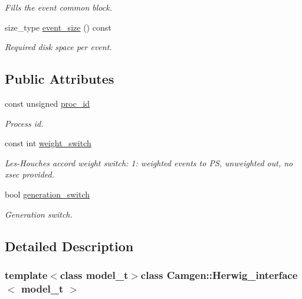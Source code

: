 \begin{DoxyCompactItemize}
\begin{DoxyCompactList}\small\item\em Fills the event common block. \end{DoxyCompactList}\item 
\hypertarget{a00283_a89bbbf1a35a57ada1275fa6e4c59e82b}{}size\+\_\+type \hyperlink{a00283_a89bbbf1a35a57ada1275fa6e4c59e82b}{event\+\_\+size} () const \label{a00283_a89bbbf1a35a57ada1275fa6e4c59e82b}

\begin{DoxyCompactList}\small\item\em Required disk space per event. \end{DoxyCompactList}\end{DoxyCompactItemize}
\subsection*{Public Attributes}
\begin{DoxyCompactItemize}
\item 
\hypertarget{a00283_a44e06946b527bf8bb1c2edc2ee48060c}{}const unsigned \hyperlink{a00283_a44e06946b527bf8bb1c2edc2ee48060c}{proc\+\_\+id}\label{a00283_a44e06946b527bf8bb1c2edc2ee48060c}

\begin{DoxyCompactList}\small\item\em Process id. \end{DoxyCompactList}\item 
const int \hyperlink{a00283_a2dedaf0e690349d499044ca1aa0ab95b}{weight\+\_\+switch}
\begin{DoxyCompactList}\small\item\em Les-\/\+Houches accord weight switch\+: 1\+: weighted events to P\+S, unweighted out, no xsec provided. \end{DoxyCompactList}\item 
bool \hyperlink{a00283_a6fd3ab282136d8ceb709e5030e9f48a3}{generation\+\_\+switch}
\begin{DoxyCompactList}\small\item\em Generation switch. \end{DoxyCompactList}\end{DoxyCompactItemize}


\subsection{Detailed Description}
\subsubsection*{template$<$class model\+\_\+t$>$class Camgen\+::\+Herwig\+\_\+interface$<$ model\+\_\+t $>$}

